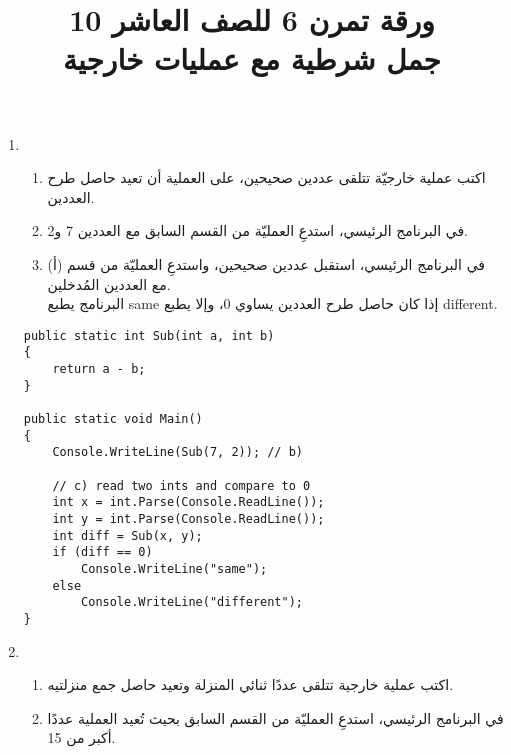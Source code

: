 \documentclass[14pt]{extarticle}
\title{ورقة تمرن 6 للصف العاشر 10 \\ جمل شرطية مع عمليات خارجية}
\begin{document}
\maketitle
\thispagestyle{fancy}


\begin{enumerate}[itemsep=3em]

\item
\begin{enumerate}
\item اكتب عملية خارجيّة تتلقى عددين صحيحين، على العملية أن تعيد حاصل طرح العددين.
\item في البرنامج الرئيسي، استدعِ العمليّة من القسم السابق مع العددين 7 و2.
\item في البرنامج الرئيسي، استقبل عددين صحيحين، واستدعِ العمليّة من قسم (أ) مع العددين المُدخلين.\\
البرنامج يطبع \textenglish{same} إذا كان حاصل طرح العددين يساوي 0، وإلا يطبع \textenglish{different}.
\end{enumerate}

\ifwithsols
\begin{boxSolution}
\begin{english}
\begin{verbatim}
public static int Sub(int a, int b)
{
    return a - b;
}

public static void Main()
{
    Console.WriteLine(Sub(7, 2)); // b)

    // c) read two ints and compare to 0
    int x = int.Parse(Console.ReadLine());
    int y = int.Parse(Console.ReadLine());
    int diff = Sub(x, y);
    if (diff == 0)
        Console.WriteLine("same");
    else
        Console.WriteLine("different");
}
\end{verbatim}
\end{english}
\end{boxSolution}
\clearpage
\fi

\item
\begin{enumerate}
\item اكتب عملية خارجية تتلقى عددًا ثنائي المنزلة وتعيد حاصل جمع منزلتيه.
\item في البرنامج الرئيسي، استدعِ العمليّة من القسم السابق بحيث تُعيد العملية عددًا أكبر من 15.
\end{enumerate}


\end{enumerate}
\end{document}
